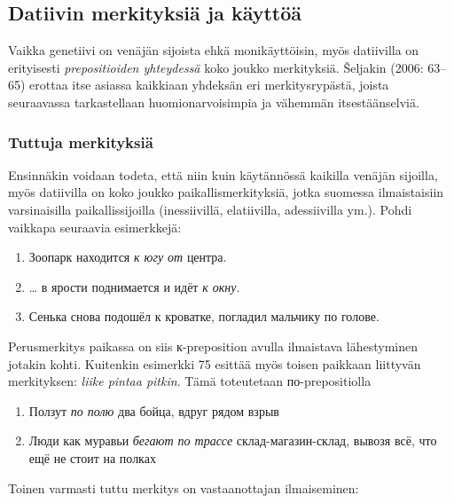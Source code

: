 \documentclass[]{scrartcl}
\providecommand{\tightlist}{%
  \setlength{\itemsep}{0pt}\setlength{\parskip}{0pt}}
\begin{document}
\subsection{Datiivin merkityksiä ja
käyttöä}\label{datiivin-merkityksiuxe4-ja-kuxe4yttuxf6uxe4}

Vaikka genetiivi on venäjän sijoista ehkä monikäyttöisin, myös
datiivilla on erityisesti \emph{prepositioiden yhteydessä} koko joukko
merkityksiä. Šeljakin (2006: 63--65) erottaa itse asiassa kaikkiaan
yhdeksän eri merkitysrypästä, joista seuraavassa tarkastellaan
huomionarvoisimpia ja vähemmän itsestäänselviä.

\subsubsection{Tuttuja merkityksiä}\label{tuttuja-merkityksiuxe4}

Ensinnäkin voidaan todeta, että niin kuin käytännössä kaikilla venäjän
sijoilla, myös datiivilla on koko joukko paikallismerkityksiä, jotka
suomessa ilmaistaisiin varsinaisilla paikallissijoilla (inessiivillä,
elatiivilla, adessiivilla ym.). Pohdi vaikkapa seuraavia esimerkkejä:

\begin{enumerate}
\def\labelenumi{(\arabic{enumi})}
\setcounter{enumi}{72}
\tightlist
\item
  Зоопарк находится \emph{к югу от} центра.
\item
  \ldots{} в ярости поднимается и идёт \emph{к окну}.
\item
  Сенька снова подошёл к кроватке, погладил мальчику по голове.
\end{enumerate}

Perusmerkitys paikassa on siis к-preposition avulla ilmaistava
lähestyminen jotakin kohti. Kuitenkin esimerkki 75 esittää myös toisen
paikkaan liittyvän merkityksen: \emph{liike pintaa pitkin}. Tämä
toteutetaan по-prepositiolla

\begin{enumerate}
\def\labelenumi{(\arabic{enumi})}
\setcounter{enumi}{75}
\tightlist
\item
  Ползут \emph{по полю} два бойца, вдруг рядом взрыв
\item
  Люди как муравьи \emph{бегают по трассе} склад-магазин-склад, вывозя
  всё, что ещё не стоит на полках
\end{enumerate}

Toinen varmasti tuttu merkitys on vastaanottajan ilmaiseminen:
\end{document}

